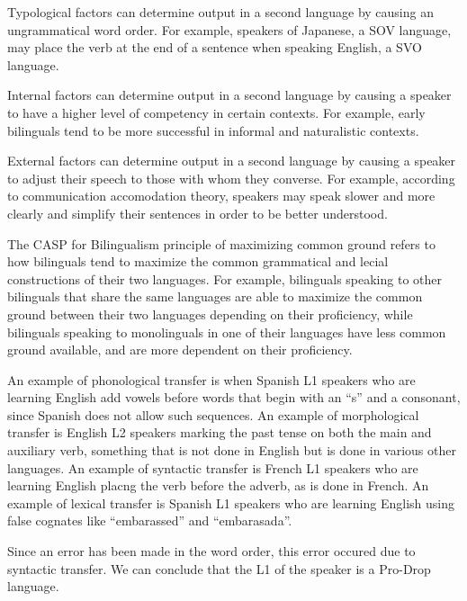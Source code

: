 \documentclass{article}
\begin{document}
\clearpage

\problem
Typological factors can determine output in a second language by causing an ungrammatical word order. For example, speakers of Japanese, a SOV language, may place the verb at the end of a sentence when speaking English, a SVO language.

Internal factors can determine output in a second language by causing a speaker to have a higher level of competency in certain contexts. For example, early bilinguals tend to be more successful in informal and naturalistic contexts.

External factors can determine output in a second language by causing a speaker to adjust their speech to those with whom they converse. For example, according to communication accomodation theory, speakers may speak slower and more clearly and simplify their sentences in order to be better understood.

\clearpage

\problem
The CASP for Bilingualism principle of maximizing common ground refers to how bilinguals tend to maximize the common grammatical and lecial constructions of their two languages. For example, bilinguals speaking to other bilinguals that share the same languages are able to maximize the common ground between their two languages depending on their proficiency, while bilinguals speaking to monolinguals in one of their languages have less common ground available, and are more dependent on their proficiency.

\clearpage

\problem
An example of phonological transfer is when Spanish L1 speakers who are learning English add vowels before words that begin with an ``s'' and a consonant, since Spanish does not allow such sequences. An example of morphological transfer is English L2 speakers marking the past tense on both the main and auxiliary verb, something that is not done in English but is done in various other languages. An example of syntactic transfer is French L1 speakers who are learning English placng the verb before the adverb, as is done in French. An example of lexical transfer is Spanish L1 speakers who are learning English using false cognates like ``embarassed'' and ``embarasada''.

\clearpage

\problem
{}
\begin{exe}
\end{exe}
Since an error has been made in the word order, this error occured due to syntactic transfer. We can conclude that the L1 of the speaker is a Pro-Drop language.
\end{document}
